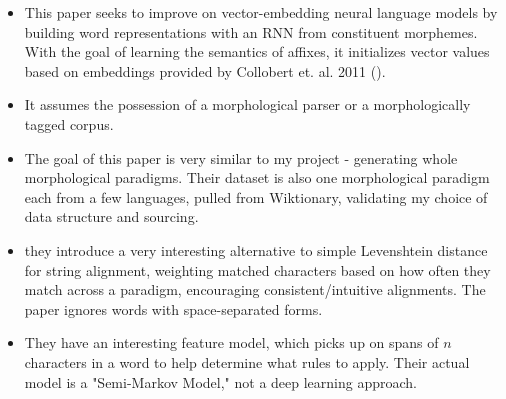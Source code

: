 \documentclass[12pt]{report}
\begin{document}

\begin{itemize} 
	
	\item This paper seeks to improve on vector-embedding neural language models by building word representations with an RNN from constituent morphemes. With the goal of learning the semantics of affixes, it initializes vector values based on embeddings provided by Collobert et. al. 2011 (\cite{Collobert2011}).
	
	\item It assumes the possession of a morphological parser or a morphologically tagged corpus.
	 
\end{itemize}


\begin{itemize}
	
	\item The goal of this paper is very similar to my project - generating whole morphological paradigms. Their dataset is also one morphological paradigm each from a few languages, pulled from Wiktionary, validating my choice of data structure and sourcing.
	
	\item they introduce a very interesting alternative to simple Levenshtein distance for string alignment, weighting matched characters based on how often they match across a paradigm, encouraging consistent/intuitive alignments. The paper ignores words with space-separated forms.
	
	\item They have an interesting feature model, which picks up on spans of $n$ characters in a word to help determine what rules to apply. Their actual model is a "Semi-Markov Model," not a deep learning approach. 
	
\end{itemize}

\end{document}
